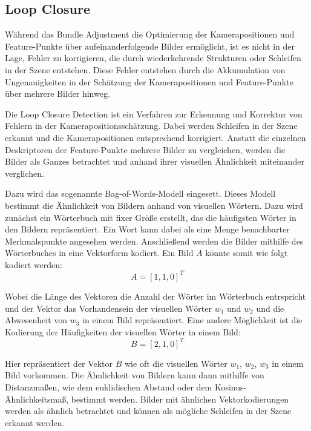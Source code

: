 \subsection{Loop Closure}

Während das Bundle Adjustment die Optimierung der Kamerapositionen und Feature-Punkte über aufeinanderfolgende Bilder ermöglicht, ist es nicht in der Lage, Fehler zu korrigieren, die durch wiederkehrende Strukturen oder Schleifen in der Szene entstehen. Diese Fehler entstehen durch die Akkumulation von Ungenauigkeiten in der Schätzung der Kamerapositionen und Feature-Punkte über mehrere Bilder hinweg. 

Die Loop Closure Detection ist ein Verfahren zur Erkennung und Korrektur von Fehlern in der Kamerapositionsschätzung. Dabei werden Schleifen in der Szene erkannt und die Kamerapositionen entsprechend korrigiert. Anstatt die einzelnen Deskriptoren der Feature-Punkte mehrere Bilder zu vergleichen, werden die Bilder als Ganzes betrachtet und anhand ihrer visuellen Ähnlichkeit miteinander verglichen.

Dazu wird das sogenannte Bag-of-Words-Modell eingesett. Dieses Modell bestimmt die Ähnlichkeit von Bildern anhand von visuellen Wörtern. Dazu wird zunächst ein Wörterbuch mit fixer Größe erstellt, das die häufigsten Wörter in den Bildern repräsentiert. Ein Wort kann dabei als eine Menge benachbarter Merkmalspunkte angesehen werden. Anschließend werden die Bilder mithilfe des Wörterbuches in eine Vektorform kodiert. Ein Bild \( A \) könnte somit wie folgt kodiert werden:
\begin{equation}
    A = [1, 1, 0]^T
\end{equation}

Wobei die Länge des Vektoren die Anzahl der Wörter im Wörterbuch entrspricht und der Vektor das Vorhandensein der visuellen Wörter \( w_1 \) und \( w_2 \) und die Abwesenheit von \( w_3 \) in einem Bild repräsentiert. Eine andere Möglichkeit ist die Kodierung der Häufigkeiten der visuellen Wörter in einem Bild:
\begin{equation}
    B = [2, 1, 0]^T
\end{equation}

Hier repräsentiert der Vektor \( B \) wie oft die visuellen Wörter \( w_1 \), \( w_2 \), \( w_3 \) in einem Bild vorkommen. Die Ähnlichkeit von Bildern kann dann mithilfe von Distanzmaßen, wie dem euklidischen Abstand oder dem Kosinus-Ähnlichkeitsmaß, bestimmt werden. Bilder mit ähnlichen Vektorkodierungen werden als ähnlich betrachtet und können als mögliche Schleifen in der Szene erkannt werden. 

